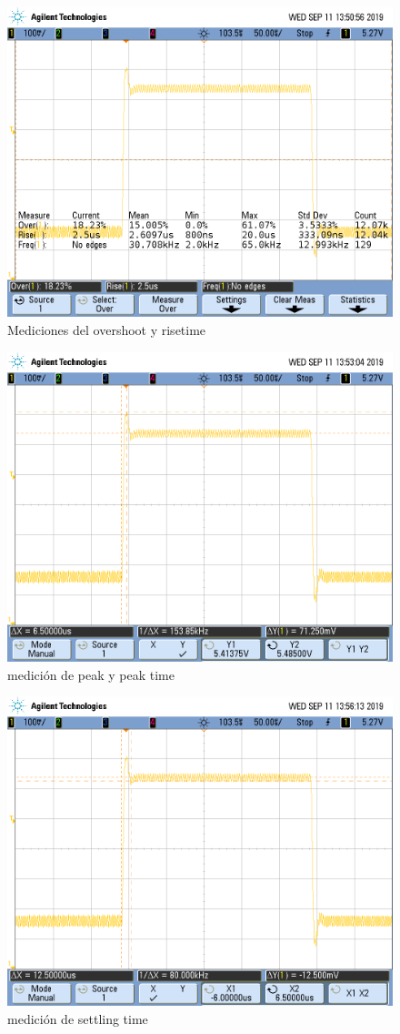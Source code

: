 \documentclass{article}
\begin{document}
\begin{figure}[H]
\centering
\includegraphics[width=0.8\linewidth]{images/05vpp/os_rt05vpp.PNG}
\caption{Mediciones del overshoot y risetime}
\label{fig:os_rt05vpp}
\end{figure}

\begin{figure}[H]
\centering
\includegraphics[width=0.8\linewidth]{images/05vpp/tpeak_vpeak.PNG}
\caption{medición de peak y peak time}
\label{fig:tpeak_vpeak}
\end{figure}


\begin{figure}[H]
\centering
\includegraphics[width=0.8\linewidth]{images/05vpp/settling_time.PNG}
\caption{medición de settling time}
\label{fig:settling_time}
\end{figure}
\end{document}
